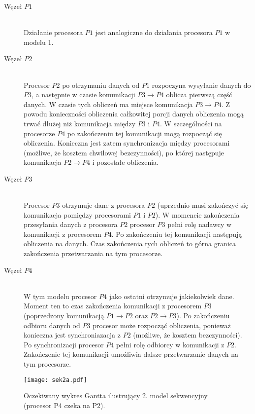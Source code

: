 \begin{description}

\item[Węzeł $P1$] \hfill \\

Działanie procesora $P1$ jest analogiczne do działania procesora $P1$ w modelu 1.

\item[Węzeł $P2$] \hfill \\

Procesor $P2$ po otrzymaniu danych od $P1$ rozpoczyna wysyłanie danych do $P3$, a następnie w czasie komunikacji $P3 \to P4$ oblicza pierwszą część danych.
W czasie tych obliczeń ma miejsce komunikacja $P3 \to P4$. Z powodu konieczności obliczenia całkowitej porcji danych obliczenia mogą trwać dłużej niż komunikacja
między $P3$ i $P4$. W szczególności na procesorze $P4$ po zakończeniu tej komunikacji mogą rozpocząć się obliczenia.
Konieczna jest zatem synchronizacja między procesorami (możliwe, że kosztem chwilowej bezczynności), po której następuje komunikacja $P2 \to P4$ i pozostałe obliczenia.

\item[Węzeł $P3$] \hfill \\

Procesor $P3$ otrzymuje dane z procesora $P2$ (uprzednio musi zakończyć się komunikacja pomiędzy procesorami $P1$ i $P2$). W momencie zakończenia przesyłania danych z procesora $P2$ procesor $P3$ pełni rolę nadawcy w komunikacji z procesorem $P4$. Po zakończeniu tej komunikacji następują obliczenia na danych. Czas zakończenia tych obliczeń to górna granica zakończenia przetwarzania na tym procesorze.

\item[Węzeł $P4$] \hfill \\

W tym modelu procesor $P4$ jako ostatni otrzymuje jakiekolwiek dane. Moment ten to czas zakończenia komunikacji z procesorem $P3$ (poprzedzony komunikacją $P1 \to P2$ oraz $P2 \to P3$). Po zakończeniu odbioru danych od $P3$ procesor może rozpocząć obliczenia, ponieważ konieczna jest synchroniazacja z $P2$ (możliwe, że kosztem bezczynności). Po synchronizacji procesor $P4$ pełni rolę odbiorcy w komunikacji z $P2$. Zakończenie tej komunikacji umożliwia dalsze przetwarzanie danych na tym procesorze. 

\end{description}

\begin{figure}[!ht]
\centering
\texttt{[image: sek2a.pdf]}
\caption{Oczekiwany wykres Gantta ilustrujący 2. model sekwencyjny (procesor P4 czeka na P2).}
\label{fig:seq2a}
\end{figure}

